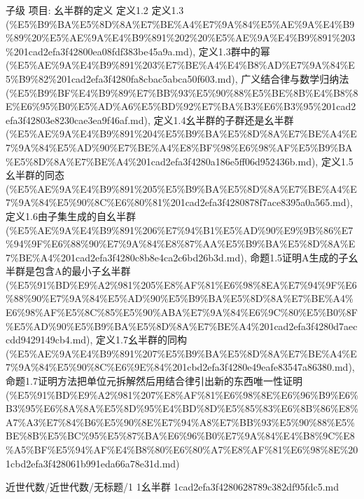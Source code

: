 \begin{note}[1.1幺半群]

子级 项目: 幺半群的定义 定义1.2 定义1.3 (\%E5\%B9\%BA\%E5\%8D\%8A\%E7\%BE\%A4\%E7\%9A\%84\%E5\%AE\%9A\%E4\%B9\%89\%20\%E5\%AE\%9A\%E4\%B9\%891\%202\%20\%E5\%AE\%9A\%E4\%B9\%891\%203\%201cad2efa3f42800ea08fdf383be45a9a.md), 定义1.3群中的幂 (\%E5\%AE\%9A\%E4\%B9\%891\%203\%E7\%BE\%A4\%E4\%B8\%AD\%E7\%9A\%84\%E5\%B9\%82\%201cad2efa3f4280fa8cbac5abca50f603.md), 广义结合律与数学归纳法 (\%E5\%B9\%BF\%E4\%B9\%89\%E7\%BB\%93\%E5\%90\%88\%E5\%BE\%8B\%E4\%B8\%8E\%E6\%95\%B0\%E5\%AD\%A6\%E5\%BD\%92\%E7\%BA\%B3\%E6\%B3\%95\%201cad2efa3f42803e8230cae3ea9f46af.md), 定义1.4幺半群的子群还是幺半群 (\%E5\%AE\%9A\%E4\%B9\%891\%204\%E5\%B9\%BA\%E5\%8D\%8A\%E7\%BE\%A4\%E7\%9A\%84\%E5\%AD\%90\%E7\%BE\%A4\%E8\%BF\%98\%E6\%98\%AF\%E5\%B9\%BA\%E5\%8D\%8A\%E7\%BE\%A4\%201cad2efa3f4280a186e5ff06d952436b.md), 定义1.5幺半群的同态 (\%E5\%AE\%9A\%E4\%B9\%891\%205\%E5\%B9\%BA\%E5\%8D\%8A\%E7\%BE\%A4\%E7\%9A\%84\%E5\%90\%8C\%E6\%80\%81\%201cad2efa3f4280878f7ace8395a0a565.md), 定义1.6由子集生成的自幺半群 (\%E5\%AE\%9A\%E4\%B9\%891\%206\%E7\%94\%B1\%E5\%AD\%90\%E9\%9B\%86\%E7\%94\%9F\%E6\%88\%90\%E7\%9A\%84\%E8\%87\%AA\%E5\%B9\%BA\%E5\%8D\%8A\%E7\%BE\%A4\%201cad2efa3f4280c8b8e4ca2c6bd26b3d.md), 命题1.5证明A生成的子幺半群是包含A的最小子幺半群 (\%E5\%91\%BD\%E9\%A2\%981\%205\%E8\%AF\%81\%E6\%98\%8EA\%E7\%94\%9F\%E6\%88\%90\%E7\%9A\%84\%E5\%AD\%90\%E5\%B9\%BA\%E5\%8D\%8A\%E7\%BE\%A4\%E6\%98\%AF\%E5\%8C\%85\%E5\%90\%ABA\%E7\%9A\%84\%E6\%9C\%80\%E5\%B0\%8F\%E5\%AD\%90\%E5\%B9\%BA\%E5\%8D\%8A\%E7\%BE\%A4\%201cad2efa3f4280d7aeccdd9429149cb4.md), 定义1.7幺半群的同构 (\%E5\%AE\%9A\%E4\%B9\%891\%207\%E5\%B9\%BA\%E5\%8D\%8A\%E7\%BE\%A4\%E7\%9A\%84\%E5\%90\%8C\%E6\%9E\%84\%201cbd2efa3f4280e49eafe83547a86380.md), 命题1.7证明方法把单位元拆解然后用结合律引出新的东西唯一性证明 (\%E5\%91\%BD\%E9\%A2\%981\%207\%E8\%AF\%81\%E6\%98\%8E\%E6\%96\%B9\%E6\%B3\%95\%E6\%8A\%8A\%E5\%8D\%95\%E4\%BD\%8D\%E5\%85\%83\%E6\%8B\%86\%E8\%A7\%A3\%E7\%84\%B6\%E5\%90\%8E\%E7\%94\%A8\%E7\%BB\%93\%E5\%90\%88\%E5\%BE\%8B\%E5\%BC\%95\%E5\%87\%BA\%E6\%96\%B0\%E7\%9A\%84\%E4\%B8\%9C\%E8\%A5\%BF\%E5\%94\%AF\%E4\%B8\%80\%E6\%80\%A7\%E8\%AF\%81\%E6\%98\%8E\%201cbd2efa3f428061b991eda66a78e31d.md)

\end{note}

\begin{note}[来源路径]

近世代数/近世代数/无标题/1 1幺半群 1cad2efa3f4280628789c382df95fdc5.md

\end{note}

